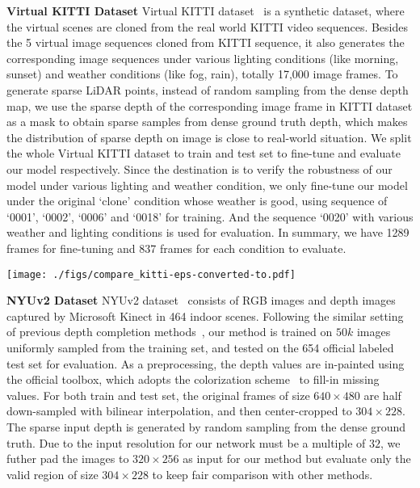 \documentclass[journal]{IEEEtran}
\begin{document}
{\bf Virtual KITTI Dataset} Virtual KITTI dataset~\cite{vkitti} is a synthetic dataset, where the virtual scenes are cloned from the real world
KITTI video sequences. 
Besides the 5 virtual image sequences cloned from KITTI sequence,
it also generates the corresponding image sequences under various lighting conditions (like morning, sunset) and weather conditions (like fog, rain),
totally 17,000 image frames.
To generate sparse LiDAR points, instead of random sampling from the dense depth map,
we use the sparse depth of the corresponding image frame in KITTI dataset as a mask to obtain sparse samples from dense ground truth depth,
which makes the distribution of sparse depth on image is close to real-world situation.
We split the whole Virtual KITTI dataset to train and test set to fine-tune and evaluate our model respectively.
Since the destination is to verify the robustness of our model under various lighting and weather condition,
we only fine-tune our model under the original `clone' condition whose weather is good, using sequence of `0001', `0002', `0006' and `0018' for training.
And the sequence `0020' with various weather and lighting conditions is used for evaluation. 
In summary, we have 1289 frames for fine-tuning and 837 frames for each condition to evaluate.


\begin{figure*}
   \begin{center}
   \texttt{[image: ./figs/compare\_kitti-eps-converted-to.pdf]}
   \end{center}
      \caption{Qualitative comparison with state-of-the-art methods on KITTI test set.
      The results are from the KITTI depth completion leaderboard in which depth images are colorized along with depth range.
      Our results are shown in the bottom row and compared with top-ranking methods
      `Sparse-to-Dense'~\cite{sparse_to_dense}, `DDP'~\cite{ddp}, `DeepLiDAR'~\cite{deep_lidar}, `CSPN'~\cite{depth_affinity,cspn_journal} and `NConv-CNN'~\cite{cnn_confidence}.
      In the zoomed regions, our method recovers better 3D details.
      }
   \label{fig:compare_kitti}
\end{figure*}

{\bf NYUv2 Dataset}
NYUv2 dataset~\cite{NYU_V2} consists of RGB images and depth images captured by Microsoft Kinect in 464 indoor scenes. 
Following the similar setting of previous depth completion methods~\cite{depth_affinity,deep_lidar,sparse_to_dense}, 
our method is trained on $50k$ images uniformly sampled from the training set, and tested on the 654 official labeled test set for evaluation.
As a preprocessing, the depth values are in-painted using the official toolbox, which adopts the colorization scheme~\cite{colorization} to fill-in missing values.
For both train and test set, the original frames of size $640\times480$ are half down-sampled with bilinear interpolation, and then center-cropped to $304\times228$. 
The sparse input depth is generated by random sampling from the dense ground truth.
Due to the input resolution for our network must be a multiple of $32$,
we futher pad the images to $320\times256$ as input for our method but evaluate only the valid region of size $304\times228$ to keep fair comparison with other methods.
\end{document}
